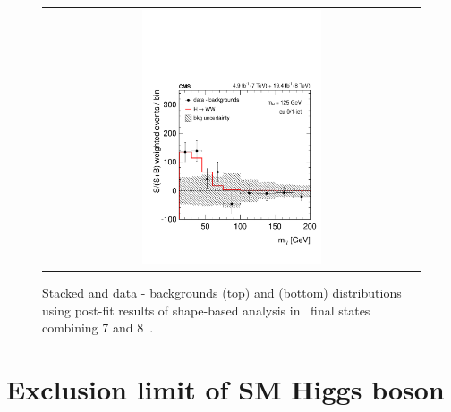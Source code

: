 \begin{figure}[htp]
\begin{tabular}{c}
\includegraphics[width=0.49\textwidth]{figures/dataminusbkg_mll_1dweight.pdf} 
\end{tabular} 
\caption{Stacked and data - backgrounds 
\mT(top) and \mll(bottom) distributions using post-fit results 
of shape-based analysis
in \DF\ final states combining 7 and 8~\TeV. }
\label{fig:post1Dprojection_1dweight} 
\end{figure} 


\section{Exclusion limit of SM Higgs boson}  


